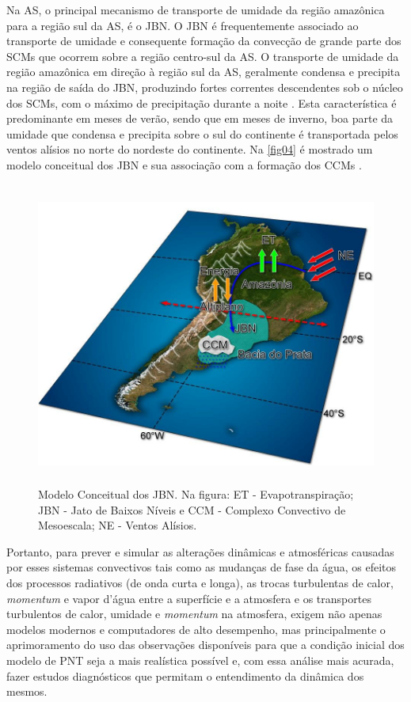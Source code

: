 Na AS, o principal mecanismo de transporte de umidade da região amazônica para a região sul da AS, é o JBN. O JBN é frequentemente associado ao transporte de umidade e consequente formação da convecção de grande parte dos SCMs \cite{ferreiraetal03} que ocorrem sobre a região centro-sul da AS. O transporte de umidade da região amazônica em direção à região sul da AS, geralmente condensa e precipita na região de saída do JBN, produzindo fortes correntes descendentes sob o núcleo dos SCMs, com o máximo de precipitação durante a noite \cite{noguesetal00}. Esta característica é predominante em meses de verão, sendo que em meses de inverno, boa parte da umidade que condensa e precipita sobre o sul do continente é transportada pelos ventos alísios no norte do nordeste do continente. Na \autoref{fig04} é mostrado um modelo conceitual dos JBN e sua associação com a formação dos CCMs \cite{marengoetal04}.

\begin{figure}[!h]
\includegraphics[height=10cm]{./figs/fig10.png}
\caption{Modelo Conceitual dos JBN. Na figura: ET - Evapotranspiração; JBN - Jato de Baixos Níveis e CCM - Complexo Convectivo de Mesoescala; NE - Ventos Alísios.}
\label{fig04}
\end{figure}

Portanto, para prever e simular as alterações dinâmicas e atmosféricas causadas por esses sistemas convectivos tais como as mudanças de fase da água, os efeitos dos processos radiativos (de onda curta e longa), as trocas turbulentas de calor, \textit{momentum} e vapor d'água entre a superfície e a atmosfera e os transportes turbulentos de calor, umidade e \textit{momentum} na atmosfera, exigem não apenas modelos modernos e computadores de alto desempenho, mas principalmente o aprimoramento do uso das observações disponíveis para que a condição inicial dos modelo de PNT seja a mais realística possível e, com essa análise mais acurada, fazer estudos diagnósticos que permitam o entendimento da dinâmica dos mesmos.

